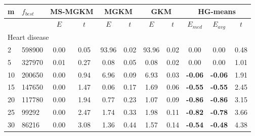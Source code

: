 {\footnotesize
\centering
\begin{longtable}{@{}llccccccccc@{}}
\hline
\multicolumn{1}{l|}{m}  & \multicolumn{1}{l|}{$f_{best}$} & \multicolumn{2}{c|}{MS-MGKM}      & \multicolumn{2}{c|}{MGKM}         & \multicolumn{2}{c|}{GKM}          & \multicolumn{3}{c}{HG-means}                \\ \hline
                        & \multicolumn{1}{l|}{}           & $E$  & \multicolumn{1}{c|}{$t$}   & $E$   & \multicolumn{1}{c|}{$t$}  & $E$   & \multicolumn{1}{c|}{$t$}  & $E_{med}$      & $E_{avg}$      & $t$   \\ \hline
\multicolumn{11}{l}{Heart disease}                                                                                                                                                                              \\ \hline
\multicolumn{1}{l|}{2}  & \multicolumn{1}{l|}{598900}     & 0.00 & \multicolumn{1}{c|}{0.05}  & 93.96 & \multicolumn{1}{c|}{0.02} & 93.96 & \multicolumn{1}{c|}{0.02} & 0.00           & 0.00           & 0.48  \\
\multicolumn{1}{l|}{5}  & \multicolumn{1}{l|}{327970}     & 0.01 & \multicolumn{1}{c|}{0.27}  & 0.08  & \multicolumn{1}{c|}{0.05} & 0.08  & \multicolumn{1}{c|}{0.02} & 0.00           & 0.00           & 1.01  \\
\multicolumn{1}{l|}{10} & \multicolumn{1}{l|}{200650}     & 0.00 & \multicolumn{1}{c|}{0.94}  & 6.96  & \multicolumn{1}{c|}{0.09} & 6.93  & \multicolumn{1}{c|}{0.03} & \textbf{-0.06} & \textbf{-0.06} & 1.91  \\
\multicolumn{1}{l|}{15} & \multicolumn{1}{l|}{147650}     & 0.00 & \multicolumn{1}{c|}{1.47}  & 0.06  & \multicolumn{1}{c|}{0.17} & 1.69  & \multicolumn{1}{c|}{0.06} & \textbf{-0.55} & \textbf{-0.55} & 2.45  \\
\multicolumn{1}{l|}{20} & \multicolumn{1}{l|}{117780}     & 0.00 & \multicolumn{1}{c|}{1.94}  & 0.77  & \multicolumn{1}{c|}{0.23} & 1.07  & \multicolumn{1}{c|}{0.09} & \textbf{-0.86} & \textbf{-0.86} & 3.15  \\
\multicolumn{1}{l|}{25} & \multicolumn{1}{l|}{99292}      & 0.00 & \multicolumn{1}{c|}{2.47}  & 1.74  & \multicolumn{1}{c|}{0.33} & 1.98  & \multicolumn{1}{c|}{0.11} & \textbf{-0.82} & \textbf{-0.78} & 3.66  \\
\multicolumn{1}{l|}{30} & \multicolumn{1}{l|}{86216}      & 0.00 & \multicolumn{1}{c|}{3.08}  & 1.36  & \multicolumn{1}{c|}{0.44} & 1.57  & \multicolumn{1}{c|}{0.14} & \textbf{-0.54} & \textbf{-0.48} & 4.38  \\

\end{longtable}}
